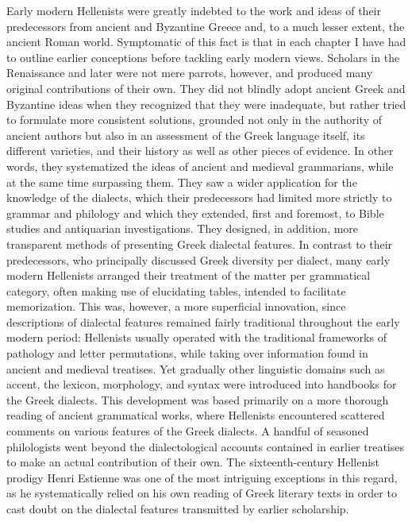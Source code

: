 Early modern Hellenists were greatly indebted to the work and ideas of their predecessors from ancient and Byzantine Greece and, to a much lesser extent, the ancient Roman world. Symptomatic of this fact is that in each chapter I have had to outline earlier conceptions before tackling early modern views. Scholars in the Renaissance and later were not mere parrots, however, and produced many original contributions of their own. They did not blindly adopt ancient Greek and Byzantine ideas when they recognized that they were inadequate, but rather tried to formulate more consistent solutions, grounded not only in the authority of ancient authors but also in an assessment of the Greek language itself, its different varieties, and their history as well as other pieces of evidence. In other words, they systematized the ideas of ancient and medieval grammarians, while at the same time surpassing them. They saw a wider application for the knowledge of the dialects, which their predecessors had limited more strictly to grammar and philology and which they extended, first and foremost, to Bible studies and antiquarian investigations. They designed, in addition, more transparent methods of presenting Greek dialectal features. In contrast to their predecessors, who principally discussed Greek diversity per dialect, many early modern Hellenists arranged their treatment of the matter per grammatical category, often making use of elucidating tables, intended to facilitate memorization. This was, however, a more superficial innovation, since descriptions of dialectal features remained fairly traditional throughout the early modern period: Hellenists usually operated with the traditional frameworks of pathology and letter permutations, while taking over information found in ancient and medieval treatises. Yet gradually other linguistic domains such as accent, the lexicon, morphology, and syntax were introduced into handbooks for the Greek dialects. This development was based primarily on a more thorough reading of ancient grammatical works, where Hellenists encountered scattered comments on various features of the Greek dialects. A handful of seasoned philologists went beyond the dialectological accounts contained in earlier treatises to make an actual contribution of their own. The sixteenth-century Hellenist prodigy Henri Estienne was one of the most intriguing exceptions in this regard, as he systematically relied on his own reading of Greek literary texts in order to cast doubt on the dialectal features transmitted by earlier scholarship.

